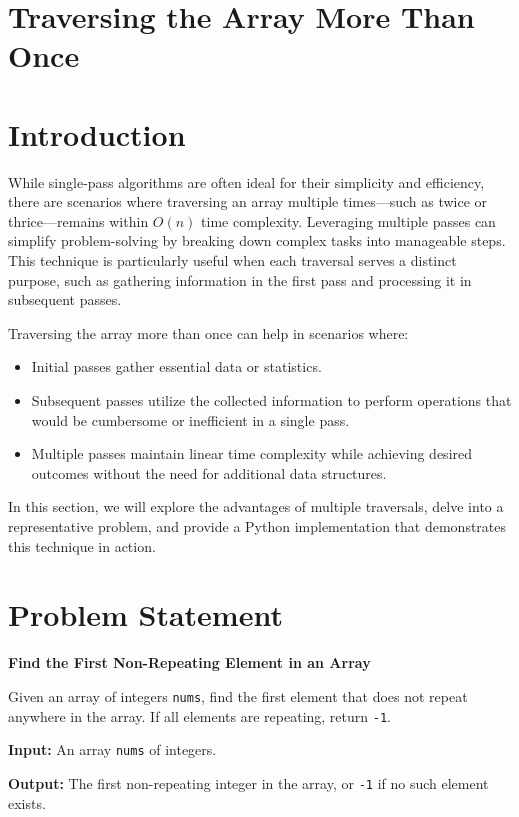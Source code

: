 \section{Traversing the Array More Than Once}

\section*{Introduction}

While single-pass algorithms are often ideal for their simplicity and efficiency, there are scenarios where traversing an array multiple times—such as twice or thrice—remains within \(O(n)\) time complexity. Leveraging multiple passes can simplify problem-solving by breaking down complex tasks into manageable steps. This technique is particularly useful when each traversal serves a distinct purpose, such as gathering information in the first pass and processing it in subsequent passes.

Traversing the array more than once can help in scenarios where:
\begin{itemize}
    \item Initial passes gather essential data or statistics.
    \item Subsequent passes utilize the collected information to perform operations that would be cumbersome or inefficient in a single pass.
    \item Multiple passes maintain linear time complexity while achieving desired outcomes without the need for additional data structures.
\end{itemize}

In this section, we will explore the advantages of multiple traversals, delve into a representative problem, and provide a Python implementation that demonstrates this technique in action.

\section*{Problem Statement}

\textbf{Find the First Non-Repeating Element in an Array}

Given an array of integers \texttt{nums}, find the first element that does not repeat anywhere in the array. If all elements are repeating, return \texttt{-1}.

\textbf{Input:} An array \texttt{nums} of integers.

\textbf{Output:} The first non-repeating integer in the array, or \texttt{-1} if no such element exists.

